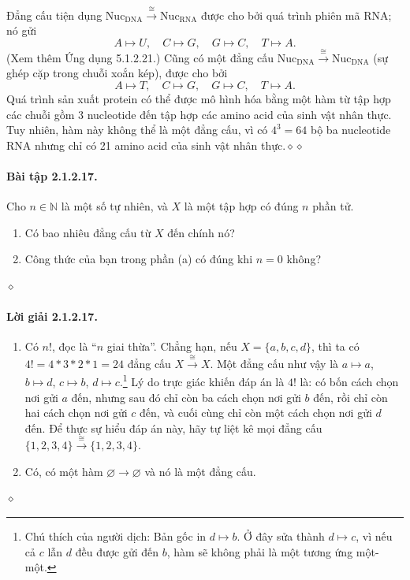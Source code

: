 Đẳng cấu tiện dụng $\mathrm{Nuc}_{\mathrm{DNA}}\xrightarrow{\cong}\mathrm{Nuc}_{\mathrm{RNA}}$ được cho bởi quá trình phiên mã RNA; nó gửi
\[A\mapsto U,\quad C\mapsto G,\quad G\mapsto C,\quad T\mapsto A.\]
(Xem thêm Ứng dụng 5.1.2.21.) Cũng có một đẳng cấu $\mathrm{Nuc}_{\mathrm{DNA}}\xrightarrow{\cong}\mathrm{Nuc}_{\mathrm{DNA}}$ (sự ghép cặp trong chuỗi xoắn kép), được cho bởi
\[A\mapsto T,\quad C\mapsto G,\quad G\mapsto C,\quad T\mapsto A.\]
Quá trình sản xuất protein có thể được mô hình hóa bằng một hàm từ tập hợp các chuỗi gồm 3 nucleotide đến tập hợp các amino acid của sinh vật nhân thực. Tuy nhiên, hàm này không thể là một đẳng cấu, vì có $4^3=64$ bộ ba nucleotide RNA nhưng chỉ có 21 amino acid của sinh vật nhân thực.\hfill$\diamond\diamond$
\paragraph{Bài tập 2.1.2.17.} Cho $n\in\mathbb N$ là một số tự nhiên, và $X$ là một tập hợp có đúng $n$ phần tử.
\begin{enumerate}[label=\alph*.]\item Có bao nhiêu đẳng cấu từ $X$ đến chính nó?\item Công thức của bạn trong phần (a) có đúng khi $n=0$ không?\end{enumerate}\hfill$\diamond$
\paragraph{Lời giải 2.1.2.17.}
\begin{enumerate}[label=\alph*.]
\item Có $n!$, đọc là ``$n$ giai thừa''. Chẳng hạn, nếu $X=\{a,b,c,d\}$, thì ta có $4!=4*3*2*1=24$ đẳng cấu $X\xrightarrow{\cong}X$. Một đẳng cấu như vậy là $a\mapsto a$, $b\mapsto d$, $c\mapsto b$, $d\mapsto c$.\begingroup\renewcommand{\thefootnote}{*}\footnote[0]{Chú thích của người dịch: Bản gốc in $d\mapsto b$. Ở đây sửa thành $d\mapsto c$, vì nếu cả $c$ lẫn $d$ đều được gửi đến $b$, hàm sẽ không phải là một tương ứng một-một.}\endgroup
 Lý do trực giác khiến đáp án là $4!$ là: có bốn cách chọn nơi gửi $a$ đến, nhưng sau đó chỉ còn ba cách chọn nơi gửi $b$ đến, rồi chỉ còn hai cách chọn nơi gửi $c$ đến, và cuối cùng chỉ còn một cách chọn nơi gửi $d$ đến. Để thực sự hiểu đáp án này, hãy tự liệt kê mọi đẳng cấu $\{1,2,3,4\}\xrightarrow{\cong}\{1,2,3,4\}$.
\item Có, có một hàm $\varnothing\to\varnothing$ và nó là một đẳng cấu.
\end{enumerate}\hfill$\diamond$
